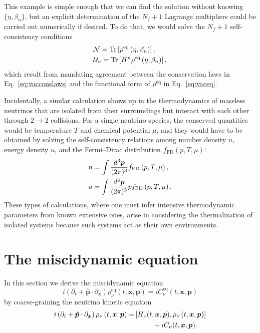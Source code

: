 \documentclass[aps,prd,twocolumn,groupedaddress]{revtex4-2}
\begin{document}
This example is simple enough that we can find the solution without knowing $\lbrace \eta, \beta_n \rbrace$, but an explicit determination of the $N_f + 1$ Lagrange multipliers could be carried out numerically if desired. To do that, we would solve the $N_f + 1$ self-consistency conditions
\begin{align}
&\mathcal{N} = \textrm{Tr} \left[ \rho^\textrm{eq} \left( \eta, \beta_n \right) \right], \notag \\
&\mathcal{U}_n = \textrm{Tr} \left[ H^n \rho^\textrm{eq} \left( \eta, \beta_n \right) \right],
\end{align}
which result from mandating agreement between the conservation laws in Eq.~\eqref{eq:vacconslaws} and the functional form of $\rho^\textrm{eq}$ in Eq.~\eqref{eq:vaceq}.

Incidentally, a similar calculation shows up in the thermodynamics of massless neutrinos that are isolated from their surroundings but interact with each other through $2 \rightarrow 2$ collisions. For a single neutrino species, the conserved quantities would be temperature $T$ and chemical potential $\mu$, and they would have to be obtained by solving the self-consistency relations among number density $n$, energy density $u$, and the Fermi--Dirac distribution $f_\textrm{FD} (p, T, \mu)$:
\begin{align}
&n = \int \frac{d^3 \boldsymbol{p}}{(2\pi)^3} f_\textrm{FD} \left( p, T, \mu \right), \notag \\
&u = \int \frac{d^3 \boldsymbol{p}}{(2\pi)^3} p f_\textrm{FD} \left( p, T, \mu \right).
\end{align} 
These types of calculations, where one must infer intensive thermodynamic parameters from known extensive ones, arise in considering the thermalization of isolated systems because such systems act as their own environments.













\section{The miscidynamic equation}

In this section we derive the miscidynamic equation
\begin{equation}
i \left( \partial_t + \boldsymbol{\hat{p}} \cdot \partial_{\boldsymbol{x}} \right) \rho_\nu^\textrm{eq} (t, \boldsymbol{x}, \boldsymbol{p}) = iC_\nu^\textrm{eq} (t, \boldsymbol{x}, \boldsymbol{p}) \label{eq:miscmisc}
\end{equation}
by coarse-graining the neutrino kinetic equation
\begin{align}
i \left( \partial_t + \boldsymbol{\hat{p}} \cdot \partial_{\boldsymbol{x}} \right) \rho_\nu \left( t, \boldsymbol{x}, \boldsymbol{p} \right) = &\left[ H_\nu (t, \boldsymbol{x}, \boldsymbol{p} ), \rho_\nu \left( t, \boldsymbol{x}, \boldsymbol{p} \right) \right] \notag \\
&~~~~~~~~ + iC_\nu (t, \boldsymbol{x}, \boldsymbol{p}). \label{eq:miscqke}
\end{align}
\end{document}
